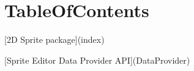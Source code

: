 \chapter{Table\+Of\+Contents}
\hypertarget{md__hey_tea_9_2_library_2_package_cache_2com_8unity_82d_8sprite_0d1_80_80_2_documentation_0i_2_table_of_contents}{}\label{md__hey_tea_9_2_library_2_package_cache_2com_8unity_82d_8sprite_0d1_80_80_2_documentation_0i_2_table_of_contents}

\begin{DoxyItemize}
\item \mbox{[}2D Sprite package\mbox{]}(index)
\item \mbox{[}Sprite Editor Data Provider API\mbox{]}(Data\+Provider) 
\end{DoxyItemize}